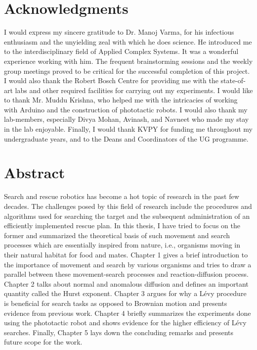 \documentclass[12pt]{report}
\begin{document}
\begin{justify}
\section*{Acknowledgments}
\vspace{4ex}
I would express my sincere gratitude to Dr. Manoj Varma,  for his infectious enthusiasm and the unyielding zeal with which he does science. He introduced me to the interdisciplinary field of Applied Complex Systems. It was a wonderful experience working with him. The frequent brainstorming sessions and the weekly group meetings proved to be critical for the successful completion of this project. I would also thank the Robert Bosch Centre for providing me with the state-of-art labs and other required facilities for carrying out my experiments. I would like to thank Mr. Muddu Krishna, who helped me with the intricacies of working with Arduino and the construction of phototactic robots. I would also thank my lab-members, especially  Divya Mohan, Avinash, and Navneet who made my stay in the lab enjoyable. 
Finally, I would thank KVPY for funding me throughout  my undergraduate years, and to
the Deans and Coordinators of the UG programme.


\newpage
\thispagestyle{empty}
\begin{center}

\end{center}
\newpage

\section*{Abstract}
\vspace{4ex}
Search and rescue robotics has become a hot topic of research in the past few decades. The challenges posed by this field of research include the procedures and algorithms used for searching the target and the subsequent administration of an efficiently implemented rescue plan. In this thesis, I have tried to focus on the former and summarized the theoretical basis of such movement and search processes which are essentially inspired from nature, i.e., organisms moving in their natural habitat for food and mates. Chapter 1 gives a brief introduction to the importance of movement and search by various organisms and tries to draw a parallel between these movement-search processes and reaction-diffusion process. Chapter 2 talks about normal and anomalous diffusion and defines an important quantity called the Hurst exponent. Chapter 3 argues for why a L\'evy procedure is beneficial for search tasks as opposed to Brownian motion and presents evidence from previous work. Chapter 4 briefly summarizes the experiments done using the phototactic robot and shows evidence for the higher efficiency of L\'evy searches. Finally, Chapter 5 lays down the concluding remarks and presents future scope for the work.    


\end{justify}
\end{document}
